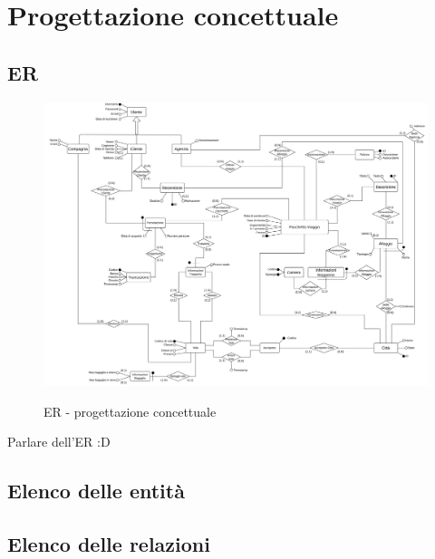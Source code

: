 \section{Progettazione concettuale}
\subsection{ER}
\begin{figure}
    \centering
    \caption{ER - progettazione concettuale}
    \includegraphics[width=\textheight,angle=90]{assets/ER_concettuale.png}
    \label{fig:er_conp}
\end{figure}

Parlare dell'ER :D

\subsection{Elenco delle entità}
\subsection{Elenco delle relazioni}